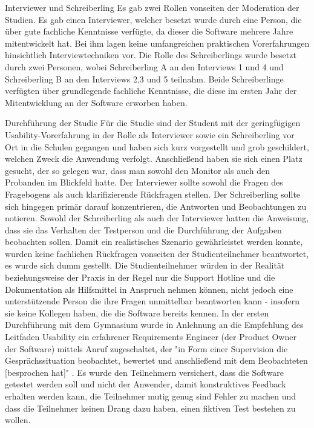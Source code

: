 Interviewer und Schreiberling
Es gab zwei Rollen vonseiten der Moderation der Studien. Es gab einen Interviewer, welcher besetzt wurde durch eine Person, die über gute fachliche Kenntnisse verfügte, da dieser die Software mehrere Jahre mitentwickelt hat. Bei ihm lagen keine umfangreichen praktischen Vorerfahrungen hinsichtlich Interviewtechniken vor. Die Rolle des Schreiberlings wurde besetzt durch zwei Personen, wobei Schreiberling A an den Interviews 1 und 4 und Schreiberling B an den Interviews 2,3 und 5 teilnahm. Beide Schreiberlinge verfügten über grundlegende fachliche Kenntnisse, die diese im ersten Jahr der Mitentwicklung an der Software erworben haben.

Durchführung der Studie
Für die Studie sind der Student mit der geringfügigen Usability-Vorerfahrung in der Rolle als Interviewer sowie ein Schreiberling vor Ort in die Schulen gegangen und haben sich kurz vorgestellt und grob geschildert, welchen Zweck die Anwendung verfolgt. Anschließend haben sie sich einen Platz gesucht, der so gelegen war, dass man sowohl den Monitor als auch den Probanden im Blickfeld hatte. Der Interviewer sollte sowohl die Fragen des Fragebogens als auch klarifizierende Rückfragen stellen. Der Schreiberling sollte sich hingegen primär darauf konzentrieren, die Antworten und Beobachtungen zu notieren.
Sowohl der Schreiberling als auch der Interviewer hatten die Anweisung, dass sie das Verhalten der Testperson und die Durchführung der Aufgaben beobachten sollen. 
Damit ein realistisches Szenario gewährleistet werden konnte, wurden keine fachlichen Rückfragen vonseiten der Studienteilnehmer beantwortet, es wurde sich dumm gestellt. Die Studienteilnehmer würden in der Realität beziehungsweise der Praxis in der Regel nur die Support Hotline und die Dokumentation als Hilfsmittel in Anspruch nehmen können, nicht jedoch eine unterstützende Person die ihre Fragen unmittelbar beantworten kann - insofern sie keine Kollegen haben, die die Software bereits kennen. 
In der ersten Durchführung mit dem Gymnasium wurde in Anlehnung an die Empfehlung des Leitfaden Usability ein erfahrener Requirements Engineer (der Product Owner der Software) mittels Anruf zugeschaltet, der "in Form einer Supervision die Gesprächssituation beobachtet, bewertet und anschließend mit dem Beobachteten [besprochen hat]" \cite[p.~133]{dakks}.
Es wurde den Teilnehmern versichert, dass die Software getestet werden soll und nicht der Anwender, damit konstruktives Feedback erhalten werden kann, die Teilnehmer mutig genug sind Fehler zu machen und dass die Teilnehmer keinen Drang dazu haben, einen fiktiven Test bestehen zu wollen.

